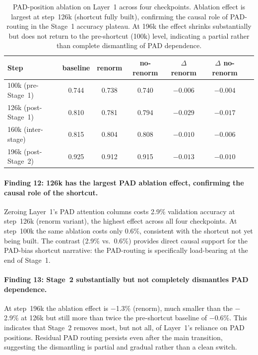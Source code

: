 \documentclass[11pt, a4paper]{article}
\begin{document}
\begin{table}[H]
\centering
\small
\begin{tabular}{@{}lcccccc@{}}
\toprule
Step & baseline & renorm & no-renorm & $\Delta$ renorm & $\Delta$ no-renorm \\
\midrule
100k (pre-Stage~1)  & 0.744 & 0.738 & 0.740 & $-0.006$ & $-0.004$ \\
126k (post-Stage~1) & 0.810 & 0.781 & 0.794 & $\mathbf{-0.029}$ & $-0.017$ \\
160k (inter-stage)  & 0.815 & 0.804 & 0.808 & $-0.010$ & $-0.006$ \\
196k (post-Stage~2) & 0.925 & 0.912 & 0.915 & $-0.013$ & $-0.010$ \\
\bottomrule
\end{tabular}
\caption{PAD-position ablation on Layer~1 across four checkpoints.  Ablation
  effect is largest at step~126k (shortcut fully built), confirming the causal
  role of PAD-routing in the Stage~1 accuracy plateau.  At 196k the effect
  shrinks substantially but does not return to the pre-shortcut (100k) level,
  indicating a partial rather than complete dismantling of PAD dependence.}
\label{tab:pad-ablation}
\end{table}

\paragraph{Finding 12: 126k has the largest PAD ablation effect, confirming the
causal role of the shortcut.}
Zeroing Layer~1's PAD attention columns costs 2.9\% validation accuracy at
step~126k (renorm variant), the highest effect across all four checkpoints.  At
step~100k the same ablation costs only 0.6\%, consistent with the shortcut not
yet being built.  The contrast (2.9\% vs.\ 0.6\%) provides direct causal support
for the PAD-bias shortcut narrative: the PAD-routing is specifically load-bearing
at the end of Stage~1.

\paragraph{Finding 13: Stage~2 substantially but not completely dismantles PAD
dependence.}
At step~196k the ablation effect is $-$1.3\% (renorm), much smaller than the
$-$2.9\% at 126k but still more than twice the pre-shortcut baseline of $-$0.6\%.
This indicates that Stage~2 removes most, but not all, of Layer~1's reliance on
PAD positions.  Residual PAD routing persists even after the main transition,
suggesting the dismantling is partial and gradual rather than a clean switch.
\end{document}
